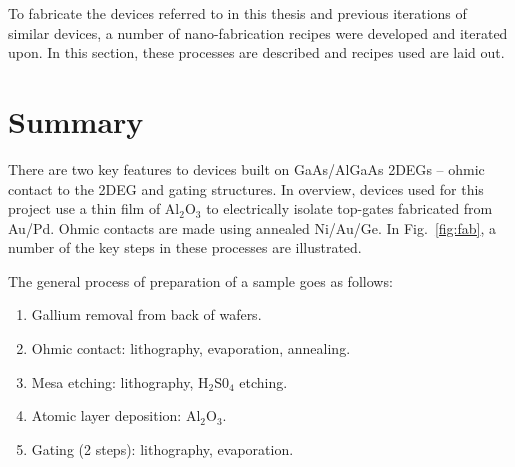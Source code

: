 To fabricate the devices referred to in this thesis and previous iterations of similar devices, a number of nano-fabrication recipes were developed and iterated upon. In this section, these processes are described and recipes used are laid out. 

\section{Summary}
\label{sec:summary}

There are two key features to devices built on GaAs/AlGaAs \ac{2DEG}s -- ohmic contact to the \ac{2DEG} and gating structures. In overview, devices used for this project use a thin film of Al$_2$O$_3$ to electrically isolate top-gates fabricated from Au/Pd. Ohmic contacts are made using annealed Ni/Au/Ge. In Fig.~\ref{fig:fab}, a number of the key steps in these processes are illustrated. 

The general process of preparation of a sample goes as follows:
\begin{enumerate}
	\item Gallium removal from back of wafers.
	\item Ohmic contact: lithography, evaporation, annealing.
	\item Mesa etching: lithography, H$_2$S0$_4$ etching.
	\item Atomic layer deposition: Al$_2$O$_3$.
	\item Gating (2 steps): lithography, evaporation.
\end{enumerate}


